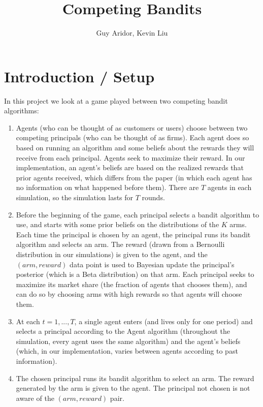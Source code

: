 \documentclass[11pt,letterpaper]{article}
\begin{document}
 

\title{Competing Bandits}
\author{Guy Aridor, Kevin Liu}
\maketitle

\section*{Introduction / Setup}

In this project we look at a game played between two competing bandit algorithms:
\begin{enumerate}
\item Agents (who can be thought of as customers or users) choose between two competing principals (who can be thought of as firms). Each agent does so based on running an algorithm and some beliefs about the rewards they will receive from each principal. Agents seek to maximize their reward. In our implementation, an agent's beliefs are based on the realized rewards that prior agents received, which differs from the paper (in which each agent has no information on what happened before them). There are $T$ agents in each simulation, so the simulation lasts for $T$ rounds.
\item Before the beginning of the game, each principal selects a bandit algorithm to use, and starts with some prior beliefs on the distributions of the $K$ arms. Each time the principal is chosen by an agent, the principal runs its bandit algorithm and selects an arm. The reward (drawn from a Bernoulli distribution in our simulations) is given to the agent, and the $(arm, reward)$ data point is used to Bayesian update the principal's posterior (which is a Beta distribution) on that arm. Each principal seeks to maximize its market share (the fraction of agents that chooses them), and can do so by choosing arms with high rewards so that agents will choose them. 
\item At each $t = 1,...,T$, a single agent enters (and lives only for one period) and selects a principal according to the Agent algorithm (throughout the simulation, every agent uses the same algorithm) and the agent's beliefs (which, in our implementation, varies between agents according to past information).
\item The chosen principal runs its bandit algorithm to select an arm. The reward generated by the arm is given to the agent. The principal not chosen is not aware of the $(arm, reward)$ pair.
\end{enumerate}
\end{document}
